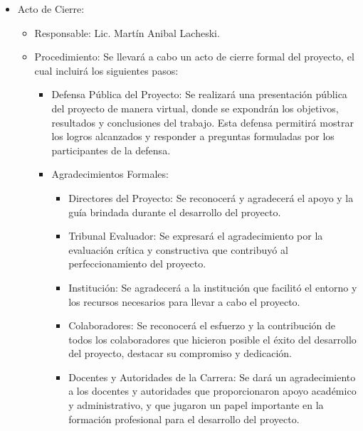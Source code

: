 \begin{itemize}
	\item Acto de Cierre:
	      \begin{itemize}
		      \item Responsable: Lic. Martín Anibal Lacheski.
		      \item Procedimiento: Se llevará a cabo un acto de cierre formal del proyecto, el cual
		            incluirá los siguientes pasos:
		            \begin{itemize}
			            \item Defensa Pública del Proyecto: Se realizará una presentación pública del
			                  proyecto de manera virtual, donde se expondrán los objetivos, resultados y
			                  conclusiones del trabajo. Esta defensa permitirá mostrar los logros alcanzados
			                  y responder a preguntas formuladas por los participantes de la defensa.
			            \item Agradecimientos Formales:
			                  \begin{itemize}
				                  \item Directores del Proyecto: Se reconocerá y agradecerá el apoyo y la guía brindada
				                        durante el desarrollo del proyecto.
				                  \item Tribunal Evaluador: Se expresará el agradecimiento por la evaluación crítica y
				                        constructiva que contribuyó al perfeccionamiento del proyecto.
				                  \item Institución: Se agradecerá a la institución que facilitó el entorno y los
				                        recursos necesarios para llevar a cabo el proyecto.
				                  \item Colaboradores: Se reconocerá el esfuerzo y la contribución de todos los
				                        colaboradores que hicieron posible el éxito del desarrollo del proyecto,
				                        destacar su compromiso y dedicación.
				                  \item Docentes y Autoridades de la Carrera: Se dará un agradecimiento a los docentes
				                        y autoridades que proporcionaron apoyo académico y administrativo, y que
				                        jugaron un papel importante en la formación profesional para el desarrollo del
				                        proyecto.
			                  \end{itemize}
		            \end{itemize}
	      \end{itemize}
\end{itemize}